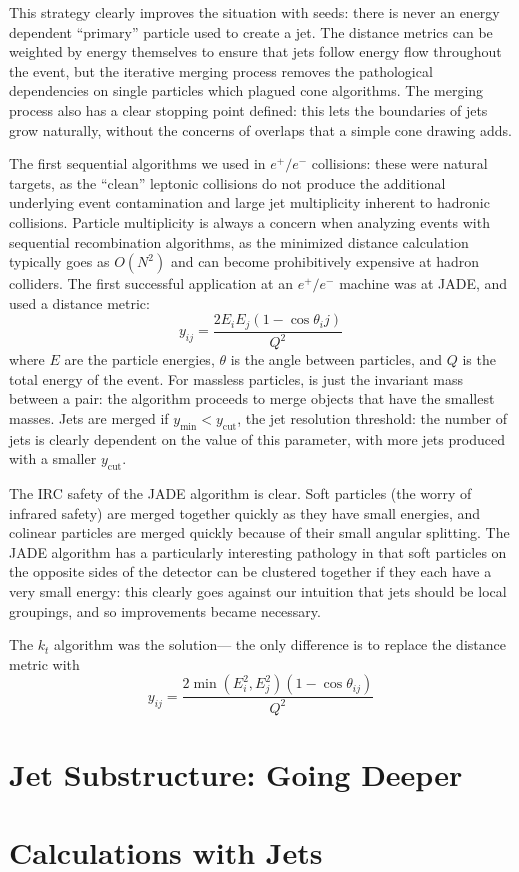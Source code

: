 This strategy clearly improves the situation with seeds: there is never an energy dependent ``primary'' particle used to create a jet. The distance metrics can be weighted by energy themselves to ensure that jets follow energy flow throughout the event, but the iterative merging process removes the pathological dependencies on single particles which plagued cone algorithms. The merging process also has a clear stopping point defined: this lets the boundaries of jets grow naturally, without the concerns of overlaps that a simple cone drawing adds.


The first sequential algorithms we used in $e^+/e^-$ collisions: these were natural targets, as the ``clean'' leptonic collisions do not produce the additional underlying event contamination and large jet multiplicity inherent to hadronic collisions. Particle multiplicity is always a concern when analyzing events with sequential recombination algorithms, as the minimized distance calculation typically goes as $O(N^2)$ and can become prohibitively expensive at hadron colliders. The first successful application at an $e^+/e^-$ machine was at JADE, and used a distance metric:
%
\begin{equation}
y_{ij} = \frac{2 E_i E_j (1 - \cos \theta_ij)}{Q^2}
\end{equation}
%
where $E$ are the particle energies, $\theta$ is the angle between particles, and $Q$ is the total energy of the event\cite{Jetography}. For massless particles, is just the invariant mass between a pair: the algorithm proceeds to merge objects that have the smallest masses. Jets are merged if $y_\mathrm{min} < y_\mathrm{cut}$, the jet resolution threshold: the number of jets is clearly dependent on the value of this parameter, with more jets produced with a smaller $y_\mathrm{cut}$.

The IRC safety of the JADE algorithm is clear. Soft particles (the worry of infrared safety) are merged together quickly as they have small energies, and colinear particles are merged quickly because of their small angular splitting. The JADE algorithm has a particularly interesting pathology in that soft particles on the opposite sides of the detector can be clustered together if they each have a very small energy: this clearly goes against our intuition that jets should be local groupings, and so improvements became necessary.

The $k_t$ algorithm was the solution--- the only difference is to replace the distance metric with
%
\begin{equation}
y_{ij} = \frac{2 \min(E_i^2,E_j^2) (1-\cos{\theta_{ij}})}{Q^2}
\end{equation}
%





\section{Jet Substructure: Going Deeper}



\section{Calculations with Jets}